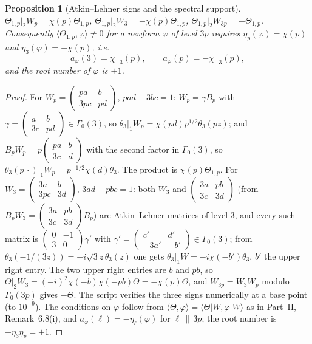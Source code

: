 \documentclass[11pt]{amsart}
\newtheorem{proposition}[theorem]{Proposition}
\theoremstyle{remark}
\begin{document}
\begin{proposition}[Atkin--Lehner signs and the spectral support]\label{prop:AL3}
$\Theta_{1,p}|_2W_p=\chi(p)\Theta_{1,p}$, $\Theta_{1,p}|_2W_3=-\chi(p)\Theta_{1,p}$, $\Theta_{1,p}|_2W_{3p}=-\Theta_{1,p}$. Consequently $\langle\Theta_{1,p},\varphi\rangle\ne0$ for a newform $\varphi$ of level $3p$ requires $\eta_p(\varphi)=\chi(p)$ and $\eta_3(\varphi)=-\chi(p)$, i.e.
\[
a_\varphi(3)=\chi_{-3}(p),\qquad a_\varphi(p)=-\chi_{-3}(p),
\]
and the root number of $\varphi$ is $+1$.
\end{proposition}
\begin{proof}
For $W_p=\left(\begin{smallmatrix}pa&b\\3pc&pd\end{smallmatrix}\right)$, $pad-3bc=1$: $W_p=\gamma B_p$ with $\gamma=\left(\begin{smallmatrix}a&b\\3c&pd\end{smallmatrix}\right)\in\Gamma_0(3)$, so $\theta_3|_1W_p=\chi(pd)p^{1/2}\theta_3(pz)$; and $B_pW_p=p\left(\begin{smallmatrix}pa&b\\3c&d\end{smallmatrix}\right)$ with the second factor in $\Gamma_0(3)$, so $\theta_3(p\,\cdot)|_1W_p=p^{-1/2}\chi(d)\theta_3$. The product is $\chi(p)\Theta_{1,p}$. For $W_3=\left(\begin{smallmatrix}3a&b\\3pc&3d\end{smallmatrix}\right)$, $3ad-pbc=1$: both $W_3$ and $\left(\begin{smallmatrix}3a&pb\\3c&3d\end{smallmatrix}\right)$ (from $B_pW_3=\left(\begin{smallmatrix}3a&pb\\3c&3d\end{smallmatrix}\right)B_p$) are Atkin--Lehner matrices of level $3$, and every such matrix is $\left(\begin{smallmatrix}0&-1\\3&0\end{smallmatrix}\right)\gamma'$ with $\gamma'=\left(\begin{smallmatrix}c'&d'\\-3a'&-b'\end{smallmatrix}\right)\in\Gamma_0(3)$; from $\theta_3(-1/(3z))=-i\sqrt3z\,\theta_3(z)$ one gets $\theta_3|_1W=-i\chi(-b')\theta_3$, $b'$ the upper right entry. The two upper right entries are $b$ and $pb$, so $\Theta|_2W_3=(-i)^2\chi(-b)\chi(-pb)\Theta=-\chi(p)\Theta$, and $W_{3p}=W_3W_p$ modulo $\Gamma_0(3p)$ gives $-\Theta$. The script verifies the three signs numerically at a base point (to $10^{-9}$). The conditions on $\varphi$ follow from $\langle\Theta,\varphi\rangle=\langle\Theta|W,\varphi|W\rangle$ as in Part~II, Remark~6.8(i), and $a_\varphi(\ell)=-\eta_\ell(\varphi)$ for $\ell\,\|\,3p$; the root number is $-\eta_3\eta_p=+1$.
\end{proof}
\end{document}

